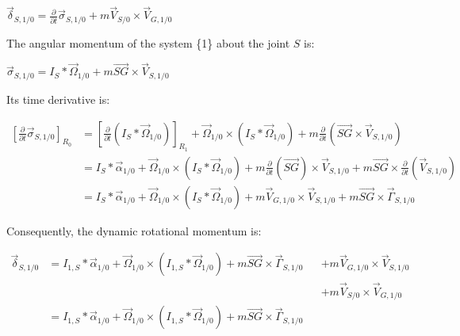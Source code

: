 \documentclass[\main/main.tex]{subfiles}
\begin{document}
{\centering
 $\overrightarrow{\delta}_{S, 1/0}
 = \frac{\partial}{\partial t}\overrightarrow{\sigma}_{S, 1/0} + m \overrightarrow{V}_{S/0} \times \overrightarrow{V}_{G, 1/0}$
 \par}

The angular momentum of the system \{1\} about the joint $S$ is:

{\centering
 $\overrightarrow{\sigma}_{S, 1/0}
 = I_{S} \ast \overrightarrow{\Omega}_{1/0} + m \overrightarrow{SG} \times \overrightarrow{V}_{S, 1/0}$
 \par}

Its time derivative is:

\begin{align*}
 {\left[ \frac{\partial}{\partial t} \overrightarrow{\sigma}_{S, 1/0} \right]}_{R_0} &
 = {\left[ \frac{\partial}{\partial t}  (I_{S} \ast \overrightarrow{\Omega}_{1/0}) \right]}_{R_1}
 + \overrightarrow{\Omega}_{1/0} \times  (I_{S} \ast \overrightarrow{\Omega}_{1/0})
 + m  \frac{\partial}{\partial t} (\overrightarrow{SG} \times \overrightarrow{V}_{S, 1/0} ) \\
                                                                                     & = I_{S} \ast \overrightarrow{\alpha}_{1/0} + \overrightarrow{\Omega}_{1/0} \times (I_{S} \ast \overrightarrow{\Omega}_{1/0})
 + m \frac{\partial}{\partial t} (\overrightarrow{SG}) \times \overrightarrow{V}_{S, 1/0}
 + m \overrightarrow{SG} \times  \frac{\partial}{\partial t} (\overrightarrow{V}_{S, 1/0} ) \\
                                                                                     & =  I_{S} \ast \overrightarrow{\alpha}_{1/0} + \overrightarrow{\Omega}_{1/0} \times (I_{S} \ast \overrightarrow{\Omega}_{1/0})
 + m  \overrightarrow{V}_{G, 1/0}  \times \overrightarrow{V}_{S, 1/0}
 + m \overrightarrow{SG} \times  \overrightarrow{\Gamma}_{S, 1/0}
\end{align*}

Consequently, the dynamic rotational momentum is:


\begin{align*}
 \overrightarrow{\delta}_{S, 1/0}
 & = I_{1, S} \ast \overrightarrow{\alpha}_{1/0} + \overrightarrow{\Omega}_{1/0} \times (I_{1, S} \ast \overrightarrow{\Omega}_{1/0})
 + m \overrightarrow{SG} \times  \overrightarrow{\Gamma}_{S, 1/0}
 && + m  \overrightarrow{V}_{G, 1/0}  \times \overrightarrow{V}_{S, 1/0} \\
   &   &   & + m \overrightarrow{V}_{S/0} \times \overrightarrow{V}_{G, 1/0} \\
 & = I_{1, S} \ast \overrightarrow{\alpha}_{1/0} + \overrightarrow{\Omega}_{1/0} \times (I_{1, S} \ast \overrightarrow{\Omega}_{1/0})
 + m \overrightarrow{SG} \times  \overrightarrow{\Gamma}_{S, 1/0}
\end{align*}
\end{document}

